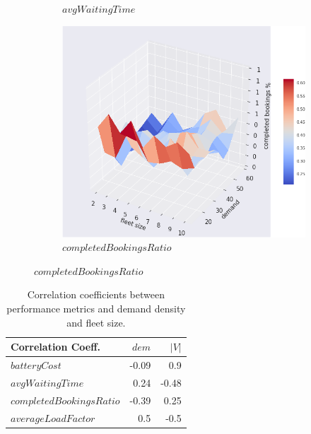 \documentclass[12pt,a4paper]{article}
\begin{document}
\begin{figure}
{\begin{subfigure}[b]{0.45\textwidth}
  \caption{$avgWaitingTime$}
  \label{wtcost}
\end{subfigure}
\begin{subfigure}[b]{0.458\textwidth}
  \includegraphics[width=\linewidth]{./images/completed.png}
  \caption{$completedBookingsRatio$}
  \label{cbr}
\end{subfigure}
}
\label{simustate}
\end{figure}


  \begin{table}
  \caption{Correlation coefficients between performance metrics and demand density and fleet size.}
  \vspace{-1.5em}
  \center
    \begin{tabular}{|l|r|r|}
     \toprule
    Correlation Coeff.& $dem$ & $|V|$ \\
    \midrule
    $batteryCost$ & -0.09 & 0.9\\
    $avgWaitingTime$ & 0.24 & -0.48\\
    $completedBookingsRatio$ & -0.39 & 0.25 \\
    $averageLoadFactor$ & 0.5 & -0.5\\
    \midrule
    \end{tabular}
    \label{correlation}
  \end{table}
\end{document}
